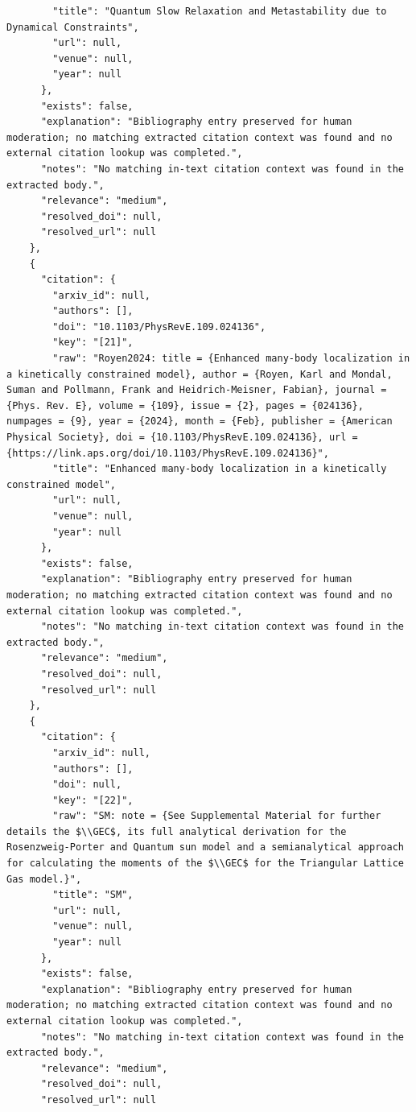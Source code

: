 \documentclass[11pt]{article}
\begin{document}
\begin{verbatim}
        "title": "Quantum Slow Relaxation and Metastability due to Dynamical Constraints",
        "url": null,
        "venue": null,
        "year": null
      },
      "exists": false,
      "explanation": "Bibliography entry preserved for human moderation; no matching extracted citation context was found and no external citation lookup was completed.",
      "notes": "No matching in-text citation context was found in the extracted body.",
      "relevance": "medium",
      "resolved_doi": null,
      "resolved_url": null
    },
    {
      "citation": {
        "arxiv_id": null,
        "authors": [],
        "doi": "10.1103/PhysRevE.109.024136",
        "key": "[21]",
        "raw": "Royen2024: title = {Enhanced many-body localization in a kinetically constrained model}, author = {Royen, Karl and Mondal, Suman and Pollmann, Frank and Heidrich-Meisner, Fabian}, journal = {Phys. Rev. E}, volume = {109}, issue = {2}, pages = {024136}, numpages = {9}, year = {2024}, month = {Feb}, publisher = {American Physical Society}, doi = {10.1103/PhysRevE.109.024136}, url = {https://link.aps.org/doi/10.1103/PhysRevE.109.024136}",
        "title": "Enhanced many-body localization in a kinetically constrained model",
        "url": null,
        "venue": null,
        "year": null
      },
      "exists": false,
      "explanation": "Bibliography entry preserved for human moderation; no matching extracted citation context was found and no external citation lookup was completed.",
      "notes": "No matching in-text citation context was found in the extracted body.",
      "relevance": "medium",
      "resolved_doi": null,
      "resolved_url": null
    },
    {
      "citation": {
        "arxiv_id": null,
        "authors": [],
        "doi": null,
        "key": "[22]",
        "raw": "SM: note = {See Supplemental Material for further details the $\\GEC$, its full analytical derivation for the Rosenzweig-Porter and Quantum sun model and a semianalytical approach for calculating the moments of the $\\GEC$ for the Triangular Lattice Gas model.}",
        "title": "SM",
        "url": null,
        "venue": null,
        "year": null
      },
      "exists": false,
      "explanation": "Bibliography entry preserved for human moderation; no matching extracted citation context was found and no external citation lookup was completed.",
      "notes": "No matching in-text citation context was found in the extracted body.",
      "relevance": "medium",
      "resolved_doi": null,
      "resolved_url": null

\end{verbatim}
\end{document}
